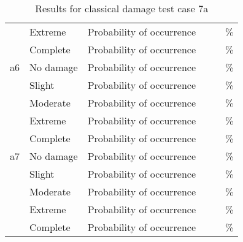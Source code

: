 \begin{table}[htbp]
\begin{tabular}{ l l l r r r }
   & Extreme   & Probability of occurrence &  &  & \% \\
   & Complete  & Probability of occurrence &  &  & \% \\
\hline
a6 & No damage & Probability of occurrence &  &  & \% \\
   & Slight    & Probability of occurrence &  &  & \% \\
   & Moderate  & Probability of occurrence &  &  & \% \\
   & Extreme   & Probability of occurrence &  &  & \% \\
   & Complete  & Probability of occurrence &  &  & \% \\
\hline
a7 & No damage & Probability of occurrence &  &  & \% \\
   & Slight    & Probability of occurrence &  &  & \% \\
   & Moderate  & Probability of occurrence &  &  & \% \\
   & Extreme   & Probability of occurrence &  &  & \% \\
   & Complete  & Probability of occurrence &  &  & \% \\
\hline
\end{tabular}

\caption{Results for classical damage test case 7a}
\label{tab:result-classical-damage-7a}
\end{table}